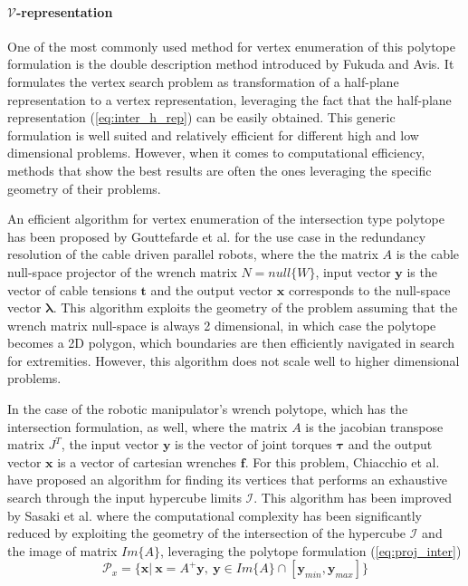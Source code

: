 \paragraph*{$\mathcal{V}$-representation} 
One of the most commonly used method for vertex enumeration of this polytope formulation is the double description method \cite{avis_pivoting_nodate} introduced by Fukuda and Avis. It formulates the vertex search problem as transformation of a half-plane representation to a vertex representation, leveraging the fact that the half-plane representation (\ref{eq:inter_h_rep}) can be easily obtained. This generic formulation is well suited and relatively efficient for different high and low dimensional problems. However, when it comes to computational efficiency, methods that show the best results are often the ones leveraging the specific geometry of their problems. 

An efficient algorithm for vertex enumeration of the intersection type polytope has been proposed by Gouttefarde et al. \cite{gouttefarde_versatile_2015} for the use case in the redundancy resolution of the cable driven parallel robots, where the the matrix $A$ is the cable null-space projector of the wrench matrix $N=null\{W\}$, input vector $\bm{y}$ is the vector of cable tensions $\bm{t}$ and the output vector $\bm{x}$ corresponds to the null-space vector $\bm{\lambda}$. This algorithm exploits the geometry of the problem assuming that the wrench matrix null-space is always 2 dimensional, in which case the polytope becomes a 2D polygon, which boundaries are then efficiently navigated in search for extremities. However, this algorithm does not scale well to higher dimensional problems.

In the case of the robotic manipulator's wrench polytope, which has the intersection formulation, as well, where the matrix $A$ is the jacobian transpose matrix $J^T$, the input vector $\bm{y}$ is the vector of joint torques $\bm{\tau}$ and the output vector $\bm{x}$ is a vector of cartesian wrenches $\bm{f}$. For this problem, Chiacchio et al. \cite{chiacchio_evaluation_1996} have proposed an algorithm for finding its vertices that performs an exhaustive search through the input hypercube limits $\mathcal{I}$. This algorithm has been improved by Sasaki et al. \cite{sasaki_vertex_nodate} where the computational complexity has been significantly reduced by exploiting the geometry of the intersection of the hypercube $\mathcal{I}$ and the image of matrix $Im\{A\}$, leveraging the polytope formulation (\ref{eq:proj_inter})
\begin{equation}
\mathcal{P}_x=\{\bm{x} |~ \bm{x} = A^+\bm{y},~ \bm{y} \in Im\{A\}\cap[\bm{y}_{min},\bm{y}_{max}]\}
\label{eq:inter_hyp_inter}
\end{equation}


